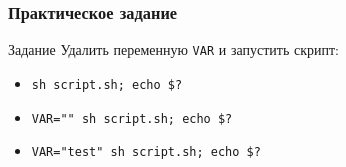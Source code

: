 \begin{frame}[fragile]
	\frametitle{Практическое задание}

	\begin{block}{Задание}
		Удалить переменную {\tt VAR} и запустить скрипт:
		\begin{itemize}
			\item {\tt sh script.sh; echo \$?}
			\item {\tt VAR="" sh script.sh; echo \$?}
			\item {\tt VAR="test" sh script.sh; echo \$?}
		\end{itemize}
	\end{block}
\end{frame}

